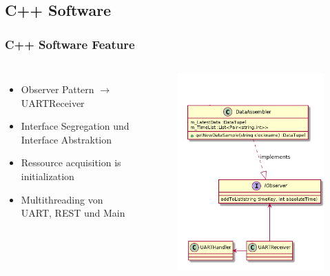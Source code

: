 \subsection{C++ Software}
\begin{frame}
    \frametitle{C++ Software Feature}
    \begin{columns}[c] %
        \begin{itemize}
            \item<1-> Observer Pattern $\rightarrow$ UARTReceiver
            \item<1-> Interface Segregation und Interface Abstraktion
            \item<1-> Ressource acquisition is initialization
            \item<1-> Multithreading von UART, REST und Main
        \end{itemize}
        \begin{figure}
            \centering
            \begin{overprint}
                \includegraphics[width=.8\textwidth]{cppfeature_observer.png}

\end{overprint}
\end{figure}
\end{columns}
\end{frame}
